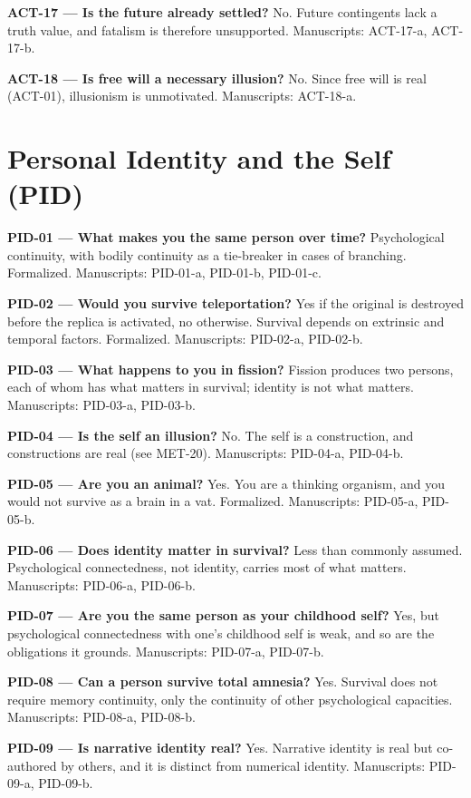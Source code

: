 \documentclass[10pt]{article}
\begin{document}
\textbf{ACT-17 --- Is the future already settled?} No. Future contingents lack a truth value, and fatalism is therefore unsupported. Manuscripts: ACT-17-a, ACT-17-b.

\textbf{ACT-18 --- Is free will a necessary illusion?} No. Since free will is real (ACT-01), illusionism is unmotivated. Manuscripts: ACT-18-a.

\section*{Personal Identity and the Self (PID)}
\textbf{PID-01 --- What makes you the same person over time?} Psychological continuity, with bodily continuity as a tie-breaker in cases of branching. Formalized. Manuscripts: PID-01-a, PID-01-b, PID-01-c.

\textbf{PID-02 --- Would you survive teleportation?} Yes if the original is destroyed before the replica is activated, no otherwise. Survival depends on extrinsic and temporal factors. Formalized. Manuscripts: PID-02-a, PID-02-b.

\textbf{PID-03 --- What happens to you in fission?} Fission produces two persons, each of whom has what matters in survival; identity is not what matters. Manuscripts: PID-03-a, PID-03-b.

\textbf{PID-04 --- Is the self an illusion?} No. The self is a construction, and constructions are real (see MET-20). Manuscripts: PID-04-a, PID-04-b.

\textbf{PID-05 --- Are you an animal?} Yes. You are a thinking organism, and you would not survive as a brain in a vat. Formalized. Manuscripts: PID-05-a, PID-05-b.

\textbf{PID-06 --- Does identity matter in survival?} Less than commonly assumed. Psychological connectedness, not identity, carries most of what matters. Manuscripts: PID-06-a, PID-06-b.

\textbf{PID-07 --- Are you the same person as your childhood self?} Yes, but psychological connectedness with one's childhood self is weak, and so are the obligations it grounds. Manuscripts: PID-07-a, PID-07-b.

\textbf{PID-08 --- Can a person survive total amnesia?} Yes. Survival does not require memory continuity, only the continuity of other psychological capacities. Manuscripts: PID-08-a, PID-08-b.

\textbf{PID-09 --- Is narrative identity real?} Yes. Narrative identity is real but co-authored by others, and it is distinct from numerical identity. Manuscripts: PID-09-a, PID-09-b.
\end{document}
